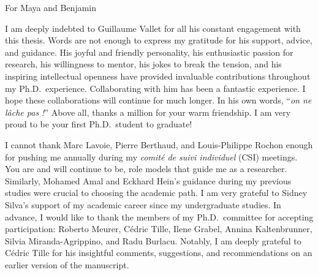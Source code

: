 \documentclass[a4paper, twoside]{templates/ociamthesis}
\begin{document}
\setcounter{secnumdepth}{3}
\setcounter{tocdepth}{3}



\begin{romanpages}



\begin{dedication}
  For Maya and Benjamin
\end{dedication}

\begin{acknowledgements}
 	I am deeply indebted to Guillaume Vallet for all his constant engagement with this thesis. Words are not enough to express my gratitude for his support, advice, and guidance. His joyful and friendly personality, his enthusiastic passion for research, his willingness to mentor, his jokes to break the tension, and his inspiring intellectual openness have provided invaluable contributions throughout my Ph.D.~experience. Collaborating with him has been a fantastic experience. I hope these collaborations will continue for much longer. In his own words, ``\emph{on ne lâche pas !}'' Above all, thanks a million for your warm friendship. I am very proud to be your first Ph.D.~student to graduate!

  I cannot thank Marc Lavoie, Pierre Berthaud, and Louis-Philippe Rochon enough for pushing me annually during my \emph{comité de suivi individuel} (CSI) meetings. You are and will continue to be, role models that guide me as a researcher. Similarly, Mohamed Amal and Eckhard Hein's guidance during my previous studies were crucial to choosing the academic path. I am very grateful to Sidney Silva's support of my academic career since my undergraduate studies. In advance, I would like to thank the members of my Ph.D.~committee for accepting participation: Roberto Meurer, Cédric Tille, Ilene Grabel, Annina Kaltenbrunner, Silvia Miranda-Agrippino, and Radu Burlacu. Notably, I am deeply grateful to Cédric Tille for his insightful comments, suggestions, and recommendations on an earlier version of the manuscript.


\end{acknowledgements}
\end{romanpages}
\end{document}
